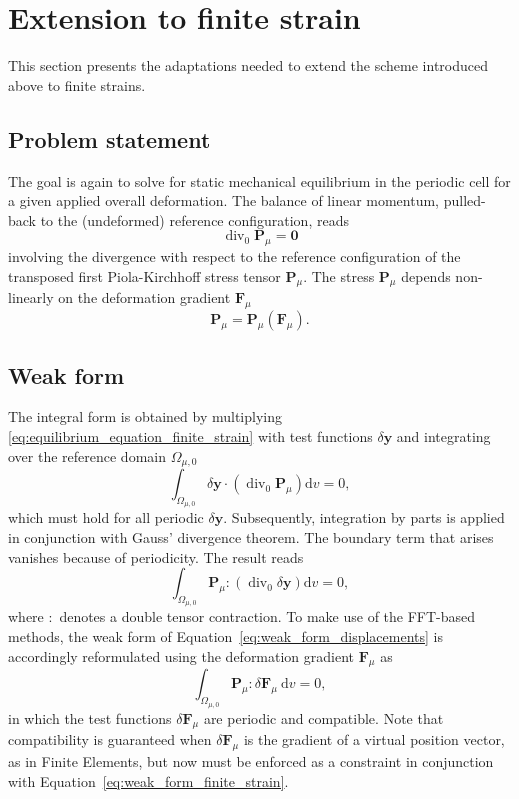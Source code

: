 \section{Extension to finite strain}

This section presents the adaptations needed to extend the scheme introduced above to finite strains.

\subsection{Problem statement}

The goal is again to solve for static mechanical equilibrium in the periodic cell for a given applied overall deformation.
The balance of linear momentum, pulled-back to the (undeformed) reference configuration, reads
\begin{equation} \label{eq:equilibrium_equation_finite_strain}
\operatorname{div}_0 \bm{P}_\mu=\bm{0}
\end{equation}
involving the divergence with respect to the reference configuration of the transposed first Piola-Kirchhoff stress tensor \(\bm{P}_\mu\).
The stress \(\bm{P}_\mu\) depends non-linearly on the deformation gradient \(\bm{F}_\mu\)
\begin{equation} \label{eq:constitutive_law_finite_strains}
\bm{P}_\mu=\bm{P}_\mu(\bm{F}_\mu).
\end{equation}

\subsection{Weak form}

The integral form is obtained by multiplying \eqref{eq:equilibrium_equation_finite_strain} with test functions \(\delta \bm y\) and integrating over the reference domain \(\Omega_{\mu,0}\)
\begin{equation}
\int_{\Omega_{\mu,0}} \delta \bm y \cdot\left(\operatorname{div}_0 \bm{P}_\mu\right) \mathrm{d} v=0,
\end{equation}
which must hold for all periodic \(\delta \bm y\).
Subsequently, integration by parts is applied in conjunction with Gauss' divergence theorem.
The boundary term that arises vanishes because of periodicity.
The result reads
\begin{equation} \label{eq:weak_form_displacements}
\int_{\Omega_{\mu,0}}\bm{P}_\mu:\left(\operatorname{div}_0 \delta \bm y\right) \mathrm{d} v=0,
\end{equation}
where \(:\) denotes a double tensor contraction.
To make use of the FFT-based methods, the weak form of Equation~\eqref{eq:weak_form_displacements} is accordingly reformulated using the deformation gradient \(\bm F_\mu\) as
\begin{equation} \label{eq:weak_form_finite_strain}
\int_{\Omega_{\mu,0}}  \bm{P}_\mu:\delta\bm{F}_\mu \mathrm{~d} v=0,
\end{equation}
in which the test functions \(\delta \bm{F}_\mu\) are periodic and compatible.
Note that compatibility is guaranteed when \(\delta \bm{F}_\mu\) is the gradient of a virtual position vector, as in Finite Elements, but now must be enforced as a constraint in conjunction with Equation~\eqref{eq:weak_form_finite_strain}.

